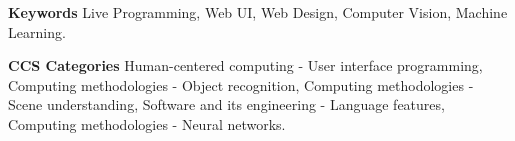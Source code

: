 \textbf{Keywords} 
Live Programming,
Web UI,
Web Design,
Computer Vision,
Machine Learning.
\newline

\textbf{CCS Categories} 
Human-centered computing - User interface programming, 
Computing methodologies - Object recognition, 
Computing methodologies - Scene understanding,
Software and its engineering - Language features,
Computing methodologies - Neural networks.

